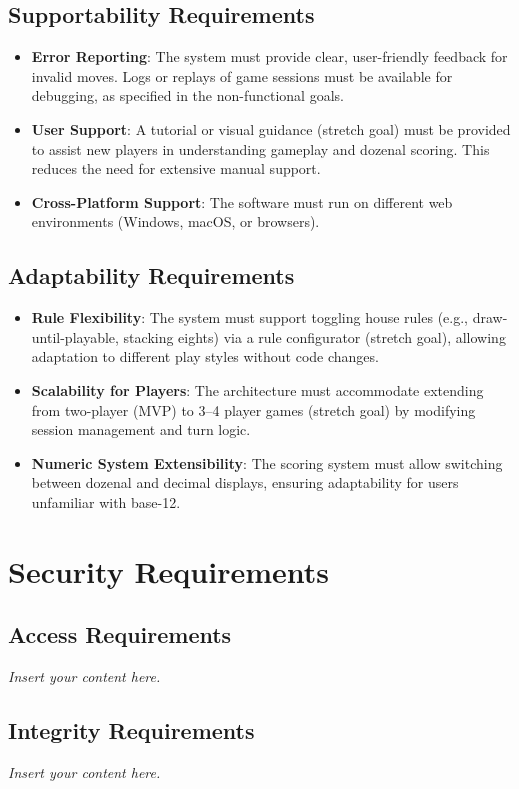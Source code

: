\documentclass[12pt]{article}
\newcommand{\lips}{\textit{Insert your content here.}}
\begin{document}
\subsection{Supportability Requirements}

\begin{itemize}
    \item \textbf{Error Reporting}: The system must provide clear, user-friendly feedback for invalid moves. Logs or replays of game sessions must be available for debugging, as specified in the non-functional goals.
    \item \textbf{User Support}: A tutorial or visual guidance (stretch goal) must be provided to assist new players in understanding gameplay and dozenal scoring. This reduces the need for extensive manual support.
    \item \textbf{Cross-Platform Support}: The software must run on different web environments (Windows, macOS, or browsers). 
\end{itemize}

\subsection{Adaptability Requirements}

\begin{itemize}
    \item \textbf{Rule Flexibility}: The system must support toggling house rules (e.g., draw-until-playable, stacking eights) via a rule configurator (stretch goal), allowing adaptation to different play styles without code changes.
    \item \textbf{Scalability for Players}: The architecture must accommodate extending from two-player (MVP) to 3--4 player games (stretch goal) by modifying session management and turn logic.
    \item \textbf{Numeric System Extensibility}: The scoring system must allow switching between dozenal and decimal displays, ensuring adaptability for users unfamiliar with base-12.
\end{itemize}

\section{Security Requirements}
\subsection{Access Requirements}
\lips
\subsection{Integrity Requirements}
\lips
\end{document}
